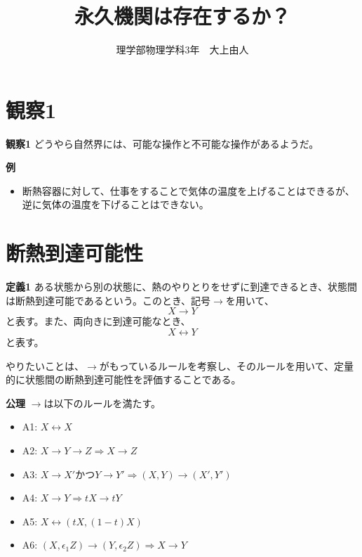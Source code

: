 \documentclass[a3paper, twocolumn, 11pt]{jsarticle}
\title{永久機関は存在するか？} %
\author{理学部物理学科3年　大上由人} %
\date{} %
\begin{document}
\maketitle %

\setlength{\columnseprule}{0.1pt} %

\section{観察1}
\begin{itembox}[l]{\textbf{観察1}}
    どうやら自然界には、可能な操作と不可能な操作があるようだ。
\end{itembox}
\textbf{例}
\begin{itemize}
    \item 断熱容器に対して、仕事をすることで気体の温度を上げることはできるが、逆に気体の温度を下げることはできない。
\end{itemize}

\section{断熱到達可能性}
\begin{itembox}[l]{\textbf{定義1}}
    ある状態から別の状態に、熱のやりとりをせずに到達できるとき、状態間は断熱到達可能であるという。このとき、記号$\rightarrow$を用いて、
    \begin{equation}
        X \rightarrow Y
    \end{equation}
    と表す。また、両向きに到達可能なとき、
    \begin{equation}
        X \leftrightarrow Y
    \end{equation}
    と表す。
\end{itembox}

やりたいことは、$\rightarrow$がもっているルールを考察し、そのルールを用いて、定量的に状態間の断熱到達可能性を評価することである。

\begin{itembox}[l]{\textbf{公理}}
    $\rightarrow$は以下のルールを満たす。
    \begin{itemize}
        \item A1: $ X \leftrightarrow X$
        \item A2: $ X \rightarrow Y \rightarrow Z \Rightarrow X \rightarrow Z$
        \item A3: $ X \rightarrow X'$かつ$Y \rightarrow Y' \Rightarrow (X,Y) \rightarrow (X',Y')$
        \item A4: $ X \rightarrow Y \Rightarrow tX \rightarrow tY$
        \item A5: $ X \leftrightarrow (tX,(1-t)X)$
        \item A6: $ (X,\epsilon_1 Z) \rightarrow (Y,\epsilon_2 Z) \Rightarrow X \rightarrow Y$
        \end{itemize}
\end{itembox}
\end{document}
